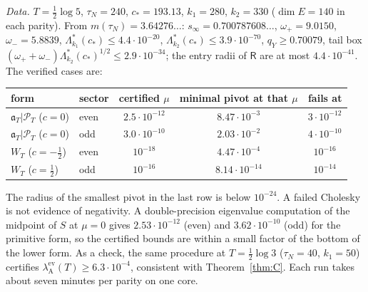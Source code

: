 \documentclass[11pt]{amsart}
\theoremstyle{definition}
\theoremstyle{remark}
\newcommand{\PT}{\mathcal P_T}
\begin{document}
\emph{Data.} $T=\frac12\log5$, $\tau_N=240$, $c_*=193.13$, $k_1=280$, $k_2=330$ ($\dim E=140$ in each parity).
From $m(\tau_N)=3.64276\ldots$: $s_\infty=0.700787608\ldots$, $\omega_+=9.0150$, $\omega_-=5.8839$,
$\Lambda^*_{k_1}(c_*)\le4.4\cdot10^{-20}$, $\Lambda^*_{k_2}(c_*)\le3.9\cdot10^{-70}$, $q_Y\ge0.70079$, tail
box $(\omega_++\omega_-)\Lambda^*_{k_2}(c_*)^{1/2}\le2.9\cdot10^{-34}$; the entry radii of $\mathsf R$ are at
most $4.4\cdot10^{-41}$. The verified cases are:
\begin{center}\small
\begin{tabular}{@{}llccc@{}}
\toprule
form & sector & certified $\mu$ & minimal pivot at that $\mu$ & fails at\\
\midrule
$\mathfrak a_T|\PT$ ($c=0$) & even & $2.5\cdot10^{-12}$ & $8.47\cdot10^{-3}$ & $3\cdot10^{-12}$\\
$\mathfrak a_T|\PT$ ($c=0$) & odd & $3.0\cdot10^{-10}$ & $2.03\cdot10^{-2}$ & $4\cdot10^{-10}$\\
$W_T$ ($c=-\frac12$) & even & $10^{-18}$ & $4.47\cdot10^{-4}$ & $10^{-16}$\\
$W_T$ ($c=\frac12$) & odd & $10^{-16}$ & $8.14\cdot10^{-14}$ & $10^{-14}$\\
\bottomrule
\end{tabular}
\end{center}
The radius of the smallest pivot in the last row is below $10^{-24}$. A failed Cholesky is not evidence of
negativity. A double-precision eigenvalue computation of the midpoint of $S$ at $\mu=0$ gives
$2.53\cdot10^{-12}$ (even) and $3.62\cdot10^{-10}$ (odd) for the primitive form, so the certified bounds are
within a small factor of the bottom of the lower form. As a check, the same procedure at
$T=\frac12\log3$ ($\tau_N=40$, $k_1=50$) certifies $\lambda^{\mathrm{ev}}_{\mathrm A}(T)\ge6.3\cdot10^{-4}$,
consistent with Theorem~\ref{thm:C}. Each run takes about seven minutes per parity on one core.
\end{document}
